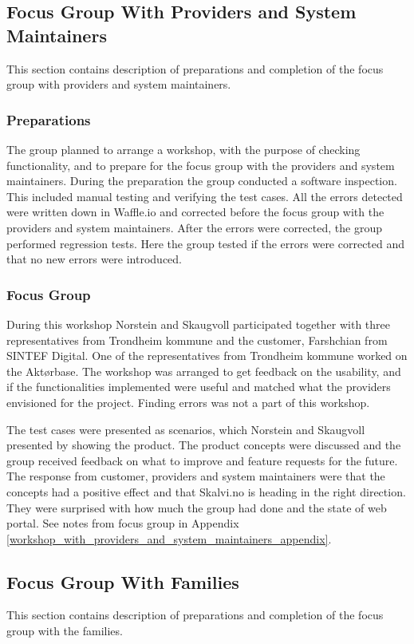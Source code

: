 \subsection{Focus Group With Providers and System Maintainers}
\label{before_focus_group_with_providers}
This section contains description of preparations and completion of the focus group with providers and system maintainers. 

\subsubsection{Preparations}
The group planned to arrange a workshop, with the purpose of checking functionality, and to prepare for the focus group with the providers and system maintainers. During the preparation the group conducted a software inspection. This included manual testing and verifying the test cases. All the errors detected were written down in Waffle.io and corrected before the focus group with the providers and system maintainers. After the errors were corrected, the group performed regression tests. Here the group tested if the errors were corrected and that no new errors were introduced.


\subsubsection{Focus Group}
\label{focusGrouoProviders}
During this workshop Norstein and Skaugvoll participated together with three representatives from Trondheim kommune and the customer, Farshchian from SINTEF Digital. One of the representatives from Trondheim kommune worked on the Aktørbase. The workshop was arranged to get feedback on the usability, and if the functionalities implemented were useful and matched what the providers envisioned for the project. Finding errors was not a part of this workshop.

The test cases were presented as scenarios, which Norstein and Skaugvoll presented by showing the product. The product concepts were discussed and the group received feedback on what to improve and feature requests for the future. The response from customer, providers and system maintainers were that the concepts had a positive effect and that Skalvi.no is heading in the right direction. They were surprised with how much the group had done and the state of web portal. See notes from focus group in Appendix \ref{workshop_with_providers_and_system_maintainers_appendix}.


\subsection{Focus Group With Families}
\label{before_focus_group_with_families}
This section contains description of preparations and completion of the focus group with the families. 

